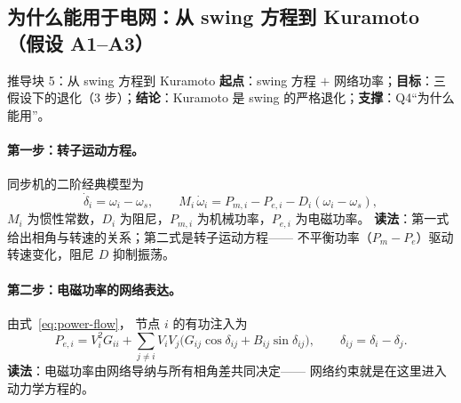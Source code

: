 \subsection{为什么能用于电网：从 swing 方程到 Kuramoto（假设 A1--A3）}
\begin{derivblock}{推导块 5：从 swing 方程到 Kuramoto}
\textbf{起点}：swing 方程 $+$ 网络功率；\textbf{目标}：三假设下的退化（3 步）；\textbf{结论}：Kuramoto 是 swing 的严格退化；\textbf{支撑}：Q4“为什么能用”。



\paragraph{第一步：转子运动方程。}
同步机的二阶经典模型为\cite{anderson2003,kundur1994}
\begin{equation}
\dot\delta_i=\omega_i-\omega_s,\qquad
M_i\,\dot\omega_i=P_{m,i}-P_{e,i}-D_i(\omega_i-\omega_s),
\label{eq:swing}
\end{equation}
$M_i$ 为惯性常数，$D_i$ 为阻尼，$P_{m,i}$ 为机械功率，$P_{e,i}$ 为电磁功率。
\textbf{读法}：第一式给出相角与转速的关系；第二式是转子运动方程——
不平衡功率（$P_m-P_e$）驱动转速变化，阻尼 $D$ 抑制振荡。

\paragraph{第二步：电磁功率的网络表达。} 由式~\eqref{eq:power-flow}，
节点 $i$ 的有功注入为
\begin{equation}
P_{e,i}=V_i^2G_{ii}+\sum_{j\neq i}V_iV_j\bigl(G_{ij}\cos\delta_{ij}+B_{ij}\sin\delta_{ij}\bigr),
\qquad \delta_{ij}=\delta_i-\delta_j .
\label{eq:Pe-general}
\end{equation}
\textbf{读法}：电磁功率由网络导纳与所有相角差共同决定——
网络约束就是在这里进入动力学方程的。


\end{derivblock}
